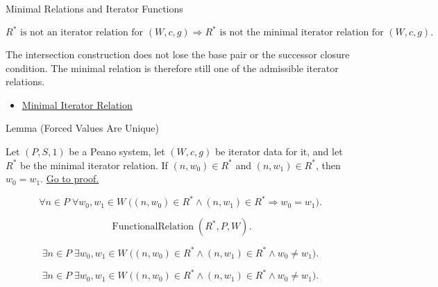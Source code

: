 \begin{topicbox}{Minimal Relations and Iterator Functions}
\begin{remark*}
\[
R^* \text{ is not an iterator relation for } (W,c,g)
\Longrightarrow
R^* \text{ is not the minimal iterator relation for } (W,c,g).
\]
\end{remark*}

\begin{remark*}[Interpretation]
The intersection construction does not lose the base pair or the successor
closure condition. The minimal relation is therefore still one of the
admissible iterator relations.
\end{remark*}

\begin{dependencies}
\begin{itemize}
  \item \hyperref[def:minimal-iterator-relation]{Minimal Iterator Relation}
\end{itemize}
\end{dependencies}

\begin{lemmabox}{Lemma (Forced Values Are Unique)}
\begin{lemma}
\label{lem:forced-values-are-unique}
Let $(P,S,1)$ be a Peano system, let $(W,c,g)$ be iterator data for it, and let
$R^*$ be the minimal iterator relation. If $(n,w_0)\in R^*$ and
$(n,w_1)\in R^*$, then $w_0=w_1$.
\hyperref[prf:forced-values-are-unique]{Go to proof.}
\end{lemma}
\end{lemmabox}

\begin{remark*}
\[
\forall n\in P\;\forall w_0,w_1\in W\;
\bigl((n,w_0)\in R^*\land (n,w_1)\in R^*\Longrightarrow w_0=w_1\bigr).
\]
\end{remark*}

\begin{remark*}
\[
\operatorname{FunctionalRelation}(R^*,P,W).
\]
\end{remark*}

\begin{remark*}
\[
\exists n\in P\;\exists w_0,w_1\in W\;
\bigl((n,w_0)\in R^*\land (n,w_1)\in R^*\land w_0\neq w_1\bigr).
\]
\end{remark*}

\begin{remark*}
\[
\exists n\in P\;\exists w_0,w_1\in W\;
\bigl((n,w_0)\in R^*\land (n,w_1)\in R^*\land w_0\neq w_1\bigr).
\]
\end{remark*}


\end{topicbox}
